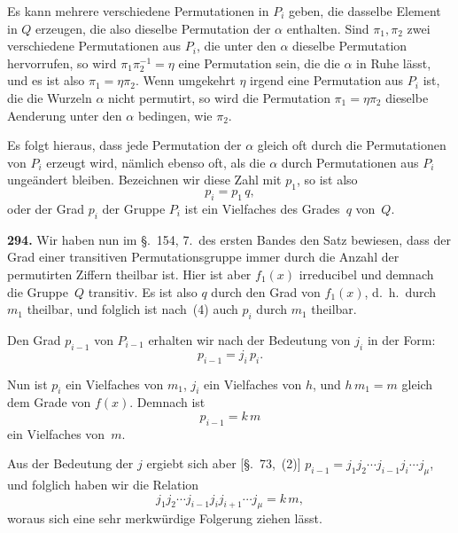 \documentclass[12pt,a4paper]{article}
\begin{document}
Es kann mehrere verschiedene Permutationen in $P_i$ geben, die dasselbe Element in $Q$ erzeugen, die also dieselbe Permutation der $\alpha$ enthalten. Sind $\pi_1,\pi_2$ zwei verschiedene Permutationen aus $P_i$, die unter den $\alpha$ dieselbe Permutation hervorrufen, so wird $\pi_1\pi_2^{-1}=\eta$ eine Permutation sein, die die $\alpha$ in Ruhe l\"asst, und es ist also $\pi_1=\eta\pi_2$. Wenn umgekehrt $\eta$ irgend eine Permutation aus $P_i$ ist, die die Wurzeln $\alpha$ nicht permutirt, so wird die Permutation $\pi_1=\eta\pi_2$ dieselbe Aenderung unter den $\alpha$ bedingen, wie $\pi_2$.

Es folgt hieraus, dass jede Permutation der $\alpha$ gleich oft durch die Permutationen von $P_i$ erzeugt wird, n\"amlich ebenso oft, als die $\alpha$ durch Permutationen aus $P_i$ unge\"andert bleiben. Bezeichnen wir diese Zahl mit $p_1$, so ist also
\begin{equation}
\tag{4}
p_i = p_1\,q,
\end{equation}
oder der Grad $p_i$ der Gruppe $P_i$ ist ein Vielfaches des Grades~$q$ von~$Q$.

\bigskip
\noindent\textbf{294.} Wir haben nun im \S.~154, 7.\ des ersten Bandes den Satz bewiesen, dass der Grad einer transitiven Permutationsgruppe immer durch die Anzahl der permutirten Ziffern theilbar ist. Hier ist aber $f_1(x)$ irreducibel und demnach die Gruppe~$Q$ transitiv. Es ist also $q$ durch den Grad von $f_1(x)$, d.~h.\ durch $m_1$ theilbar, und folglich ist nach~(4) auch $p_i$ durch $m_1$ theilbar.

Den Grad $p_{i-1}$ von $P_{i-1}$ erhalten wir nach der Bedeutung von $j_i$ in der Form:
\begin{equation}
\tag{5}
p_{i-1} = j_i\,p_i.
\end{equation}

Nun ist $p_i$ ein Vielfaches von $m_1$, $j_i$ ein Vielfaches von $h$, und $h\,m_1=m$ gleich dem Grade von $f(x)$. Demnach ist
\begin{equation}
\tag{6}
p_{i-1} = k\,m
\end{equation}
ein Vielfaches von~$m$.

Aus der Bedeutung der $j$ ergiebt sich aber [\S.~73,~(2)]
$p_{i-1} = j_1 j_2 \cdots j_{i-1} j_i \cdots j_{\mu}$, und folglich haben wir die Relation
\begin{equation}
\tag{7}
j_1 j_2 \cdots j_{i-1} j_i j_{i+1} \cdots j_{\mu} = k\,m,
\end{equation}
woraus sich eine sehr merkw\"urdige Folgerung ziehen l\"asst.
\end{document}
